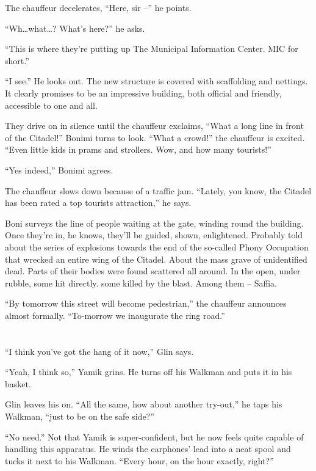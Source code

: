 \documentclass[twoside,11pt]{book}
\begin{document}
The chauffeur decelerates, ``Here, sir --'' he points.

``Wh{\ldots}what{\dots}? What's here?'' he asks.

``This is where they're putting up The Municipal Information Center. MIC for short.''

``I see.'' He looks out. The new structure is covered with scaffolding and nettings.
It clearly promises to be an impressive building, both official and friendly, accessible to one and
all.

They drive on in silence until the chauffeur exclaims, ``What a long line in front of the
Citadel!'' Bonimi turns to look. ``What a crowd!'' the chauffeur is excited.
``Even little kids in prams and strollers. Wow, and how many tourists!''

``Yes indeed,'' Bonimi agrees.

The chauffeur slows down because of a traffic jam. ``Lately, you know, the Citadel has been rated a top
tourists attraction,'' he says.

Boni surveys the line of people waiting at the gate, winding round the building. Once they're in, he knows, they'll be
guided, shown, enlightened. Probably told about the series of explosions towards the end of the so-called Phony
Occupation that wrecked an entire wing of the Citadel. About the mass grave of unidentified dead. Parts of their
bodies were found scattered all around. In the open, under rubble, some hit directly. some killed by the blast. Among
them -- Saffia.

``By tomorrow this street will become pedestrian,'' the chauffeur announces almost formally.
``To-morrow we inaugurate the ring road.''


\bigskip

\chapter{}

``I think you've got the hang of it now,'' Glin says.

``Yeah, I think so,'' Yamik grins. He turns off his Walkman and puts it in his basket.

Glin leaves his on. ``All the same, how about another try-out,'' he taps his Walkman, ``just
to be on the safe side?''

``No need.'' Not that Yamik is super-confident, but he now feels quite capable of handling
this apparatus. He winds the earphones' lead into a neat spool and tucks it next to his Walkman. ``Every
hour, on the hour exactly, right?'' \
\end{document}
